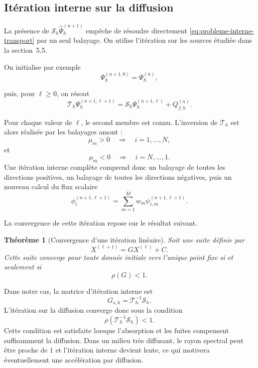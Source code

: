 \documentclass{article}
\newtheorem{theorem}{Théorème}[section]
\begin{document}
\subsection {Itération interne sur la diffusion}

La présence de $\mathcal S_h\widehat{\Psi}_h^{(n+1)}$ empêche de résoudre directement \eqref{eq:probleme-interne-transport} par un seul balayage. On utilise l'itération sur les sources étudiée dans la section~5.5.

On initialise par exemple
\[ \Psi_h^{(n+1,0)} = \Psi_h^{(n)}, \]

puis, pour $\ell\geq0$, on résout
\begin{equation}
    \boxed{
        \mathcal T_h \Psi_h^{(n+1,\ell+1)} =
        \mathcal S_h \Psi_h^{(n+1,\ell)} + Q_{f,h}^{(n)}.
    }
    \label{eq:iteration-interne-scattering}
\end{equation}

Pour chaque valeur de $\ell$, le second membre est connu. L'inversion de $\mathcal T_h$ est alors réalisée par les balayages amont :
\[
    \mu_m>0 \quad \Longrightarrow  \quad i=1,\ldots,N,
\]
et
\[
    \mu_m<0  \quad  \Longrightarrow  \quad  i=N,\ldots,1.
\]
Une itération interne complète comprend donc un balayage de toutes les directions positives, un balayage de toutes les directions négatives, puis un nouveau calcul du flux scalaire
\[
    \phi_i^{(n+1,\ell+1)} = \sum_{m=1}^{M} w_m\psi_{i,m}^{(n+1,\ell+1)}.
\]

La convergence de cette itération repose sur le résultat suivant.

\begin{theorem}[Convergence d'une itération linéaire]
    Soit une suite définie par
    \[  X^{(\ell+1)}=GX^{(\ell)}+C. \]
    Cette suite converge pour toute donnée initiale vers l'unique point fixe si et seulement si
    \[  \rho(G)<1. \]
\end{theorem}

Dans notre cas, la matrice d'itération interne est
\[
    G_{s,h} =  \mathcal T_h^{-1}\mathcal S_h.
\]
L'itération sur la diffusion converge donc sous la condition
\begin{equation}
    \rho\!\left( \mathcal T_h^{-1}\mathcal S_h \right)<1.
    \label{eq:condition-convergence-interne}
\end{equation}
Cette condition est satisfaite lorsque l'absorption et les fuites compensent suffisamment la diffusion. Dans un milieu très diffusant, le rayon spectral peut être proche de $1$ et l'itération interne devient lente, ce qui motivera éventuellement une accélération par diffusion.
\end{document}
